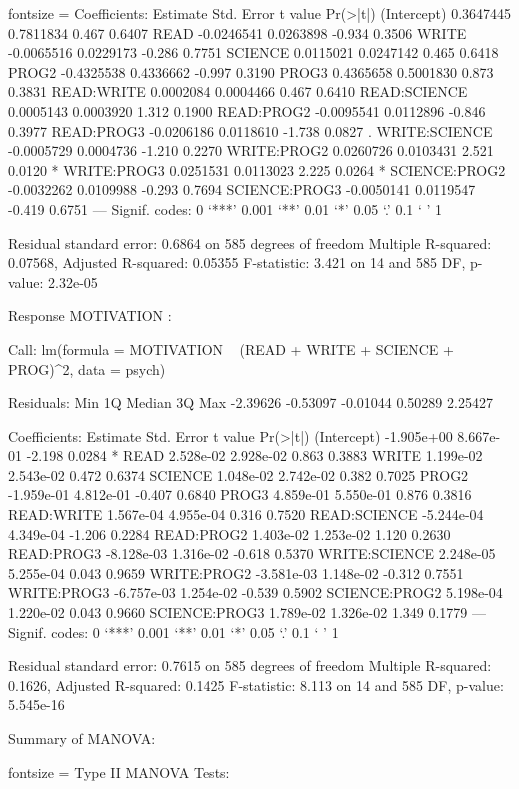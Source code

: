 \documentclass{article}
\begin{document}
\begin{enumerate}[leftmargin = 0 em, label = \arabic*., font = \bfseries]
\begin{enumerate}
\begin{rcode*}{fontsize = \footnotesize}
Coefficients:
                Estimate Std. Error t value Pr(>|t|)  
(Intercept)    0.3647445  0.7811834   0.467   0.6407  
READ          -0.0246541  0.0263898  -0.934   0.3506  
WRITE         -0.0065516  0.0229173  -0.286   0.7751  
SCIENCE        0.0115021  0.0247142   0.465   0.6418  
PROG2         -0.4325538  0.4336662  -0.997   0.3190  
PROG3          0.4365658  0.5001830   0.873   0.3831  
READ:WRITE     0.0002084  0.0004466   0.467   0.6410  
READ:SCIENCE   0.0005143  0.0003920   1.312   0.1900  
READ:PROG2    -0.0095541  0.0112896  -0.846   0.3977  
READ:PROG3    -0.0206186  0.0118610  -1.738   0.0827 .
WRITE:SCIENCE -0.0005729  0.0004736  -1.210   0.2270  
WRITE:PROG2    0.0260726  0.0103431   2.521   0.0120 *
WRITE:PROG3    0.0251531  0.0113023   2.225   0.0264 *
SCIENCE:PROG2 -0.0032262  0.0109988  -0.293   0.7694  
SCIENCE:PROG3 -0.0050141  0.0119547  -0.419   0.6751  
---
Signif. codes:  0 ‘***’ 0.001 ‘**’ 0.01 ‘*’ 0.05 ‘.’ 0.1 ‘ ’ 1

Residual standard error: 0.6864 on 585 degrees of freedom
Multiple R-squared:  0.07568,	Adjusted R-squared:  0.05355 
F-statistic: 3.421 on 14 and 585 DF,  p-value: 2.32e-05


Response MOTIVATION :

Call:
lm(formula = MOTIVATION ~ (READ + WRITE + SCIENCE + PROG)^2, 
    data = psych)

Residuals:
     Min       1Q   Median       3Q      Max 
-2.39626 -0.53097 -0.01044  0.50289  2.25427 

Coefficients:
                Estimate Std. Error t value Pr(>|t|)  
(Intercept)   -1.905e+00  8.667e-01  -2.198   0.0284 *
READ           2.528e-02  2.928e-02   0.863   0.3883  
WRITE          1.199e-02  2.543e-02   0.472   0.6374  
SCIENCE        1.048e-02  2.742e-02   0.382   0.7025  
PROG2         -1.959e-01  4.812e-01  -0.407   0.6840  
PROG3          4.859e-01  5.550e-01   0.876   0.3816  
READ:WRITE     1.567e-04  4.955e-04   0.316   0.7520  
READ:SCIENCE  -5.244e-04  4.349e-04  -1.206   0.2284  
READ:PROG2     1.403e-02  1.253e-02   1.120   0.2630  
READ:PROG3    -8.128e-03  1.316e-02  -0.618   0.5370  
WRITE:SCIENCE  2.248e-05  5.255e-04   0.043   0.9659  
WRITE:PROG2   -3.581e-03  1.148e-02  -0.312   0.7551  
WRITE:PROG3   -6.757e-03  1.254e-02  -0.539   0.5902  
SCIENCE:PROG2  5.198e-04  1.220e-02   0.043   0.9660  
SCIENCE:PROG3  1.789e-02  1.326e-02   1.349   0.1779  
---
Signif. codes:  0 ‘***’ 0.001 ‘**’ 0.01 ‘*’ 0.05 ‘.’ 0.1 ‘ ’ 1

Residual standard error: 0.7615 on 585 degrees of freedom
Multiple R-squared:  0.1626,	Adjusted R-squared:  0.1425 
F-statistic: 8.113 on 14 and 585 DF,  p-value: 5.545e-16
\end{rcode*}
Summary of MANOVA:
\begin{rcode*}{fontsize = \footnotesize}
Type II MANOVA Tests:


\end{rcode*}
\end{enumerate}
\end{enumerate}
\end{document}
